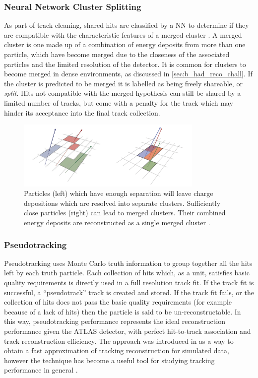 \subsubsection{Neural Network Cluster Splitting}
As part of track cleaning, shared hits are classified by a NN to determine if they are compatible with the characteristic features of a merged cluster \cite{PERF-2012-05, ATL-PHYS-PUB-2015-006}.
A merged cluster is one made up of a combination of energy deposits from more than one particle, which have become merged due to the closeness of the associated particles and the limited resolution of the detector.
It is common for clusters to become merged in dense environments, as discussed in \cref{sec:b_had_reco_chall}.
If the cluster is predicted to be merged it is labelled as being freely shareable, or \textit{split}.
Hits not compatible with the merged hypothesis can still be shared by a limited number of tracks, but come with a penalty for the track which may hinder its acceptance into the final track collection.
%
\begin{figure}[ht]
    \centering
    \includegraphics[width=0.8\textwidth]{chapters/2.detector/figs/merged-cluster.png}
    \caption{
      Particles (left) which have enough separation will leave charge depositions which are resolved into separate clusters.
      Sufficiently close particles (right) can lead to merged clusters.
      Their combined energy deposits are reconstructed as a single merged cluster \cite{PERF-2015-08}.}
    \label{fig:resolved/merged clusters}
\end{figure}
%

\subsubsection{Pseudotracking}\label{sec:pseudotracks}

Pseudotracking uses Monte Carlo truth information to group together all the hits left by each truth particle.
Each collection of hits which, as a unit, satisfies basic quality requirements is directly used in a full resolution track fit.
If the track fit is successful, a ``pseudotrack'' track is created and stored.
If the track fit fails, or the collection of hits does not pass the basic quality requirements (for example because of a lack of hits) then the particle is said to be un-reconstructable.
In this way, pseudotracking performance represents the ideal reconstruction performance given the ATLAS detector, with perfect hit-to-track association and track reconstruction efficiency.
The approach was introduced in  as a way to obtain a fast approximation of tracking reconstruction for simulated data, however the technique has become a useful tool for studying tracking performance in general \cite{ATL-PHYS-PUB-2015-006}.


